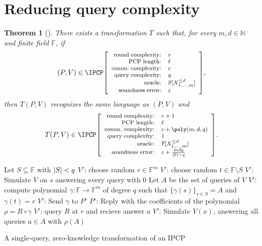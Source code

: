 \documentclass[english,12pt]{reedthesis}
\theoremstyle{plain}
\newtheorem{thm}{Theorem}[section]
\theoremstyle{definition}
\theoremstyle{remark}
\DeclarePairedDelimiter{\abs}{\lvert}{\rvert}
\newcommand{\ldipcp}[6]{%
  \ensuremath%
  \mleft[{\footnotesize\begin{array}{r l}
    \text{round complexity:} & #1 \\
    \text{PCP length:} & #2 \\
    \text{comm.\ complexity:} & #3 \\
    \text{query complexity:} & #4 \\
    \text{oracle:} & #5 \\
    \text{soundness error:} & #6
  \end{array}}\mright]%
}
\begin{document}
\section{Reducing query complexity}\label{sec:reduce-queries}

\begin{thm}[{\cite[Prop.\ 9.2]{CFGS22}}]\label{thm:ipcp-one-query}
  There exists a transformation $T$ such that, for every $m, d \in \mathbb{N}$ and finite
  field $\mathbb{F}$, if
  \begin{equation*}
    (P, V) \in \IPCP\ldipcp{r}{\ell}{c}{q}{\mathbb{F}[X_{1, \ldots, m}^{\le d}]}{\varepsilon},
  \end{equation*}
  then $T(P, V)$ recognizes the same language as $(P, V)$ and
  \begin{equation*}
    T(P, V) \in \IPCP\ldipcp{r+1}{\ell}{c+\poly(m,d,q)}{1}{\mathbb{F}[X_{1, \ldots, m}^{\le d}]}{\varepsilon+\frac{mdq}{\abs{\mathbb{F}}-q}}.
  \end{equation*}
\end{thm}

\begin{algorithm}[htbp]
  Let $S \subseteq \mathbb{F}$ with $\abs{S} < q$\;
  $V'$: choose random $r \in \mathbb{F}^{m}$\;
  $V'$: choose random $t \in \mathbb{F} \setminus S$\;
  $V'$: Simulate $V$ on $s$ answering every query with
  $0$\;
  Let $A$ be the set of queries of $V$\;
  $V'$: compute polynomial $\gamma\colon \mathbb{F} \rightarrow \mathbb{F}^{m}$ of degree $q$
  such that $\{\gamma(s)\}_{s \in S} = A$ and $\gamma(t) = r$\;
  $V'$: Send $\gamma$ to $P'$\;
  $P'$: Reply with the coefficients of the polynomial $\rho = R \circ \gamma$\;
  $V'$: query $R$ at $r$ and recieve answer $a$\;
  $V'$: Simulate $V(x)$, answering all queries $a \in A$ with
  $\rho(A)$\;
  \;
  \caption{A single-query, zero-knowledge transformation of an
    IPCP~\cite[Construction 4]{CFGS22}}\label{alg:single-query}
\end{algorithm}
\end{document}
